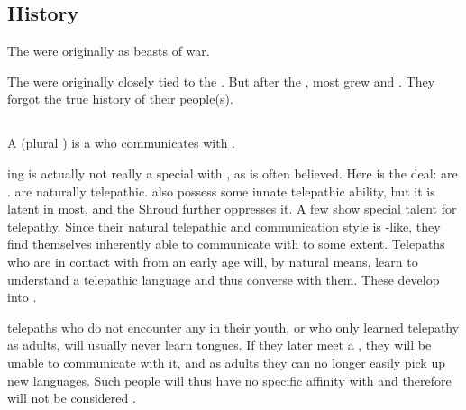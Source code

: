








\subsection{History}
The \nycans{} were originally  as beasts of war. 

The \nycans{} were originally closely tied to the . 
But after the \CuezcanApocalypse, most \nycans{} grew \quo{\Wylde} and .
They forgot the true history of their people(s). 









\subsection[Nycaneers]{\Nycaneers}
\index{\nycan!\nycaneer}
A \nycaneer{} (plural \emph{\nycaneers{}}) is a \scathaese{}  who communicates with \nycans{}. 

\Nycaneer ing is actually not really a special  with \nycans, as is often believed. 
Here is the deal: 
\Scathae{} are . \Nycans{} are naturally telepathic. 
\Scathae{} also possess some innate telepathic ability, but it is latent in most, and the Shroud further oppresses it. 
A few \scathae{} show special talent for telepathy. 
Since their natural telepathic  and communication style is \nycan-like, they find themselves inherently able to communicate with \nycans{} to some extent. 
Telepaths who are in contact with \nycans{} from an early age will, by natural means, learn to understand a telepathic \nycan{} language and thus converse with them. 
These develop into \nycaneers. 

\Scathaese{} telepaths who do not encounter any \nycans{} in their youth, or who only learned telepathy as adults, will usually never learn \nycan{} tongues. 
If they later meet a \nycan, they will be unable to communicate with it, and as adults they can no longer easily pick up new languages. 
Such people will thus have no specific affinity with \nycans{} and therefore will not be considered \nycaneers. 

